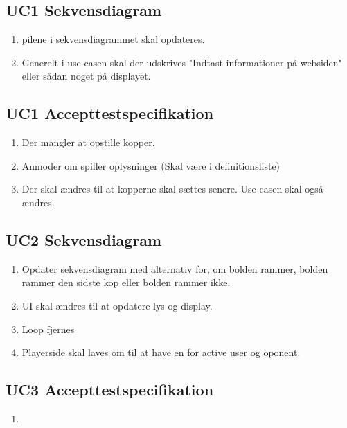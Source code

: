 \subsection{UC1 Sekvensdiagram}
\begin{enumerate}
    \item pilene i sekvensdiagrammet skal opdateres.
    \item Generelt i use casen skal der udskrives "Indtast informationer på websiden" eller sådan noget på displayet.
\end{enumerate}
\subsection{UC1 Accepttestspecifikation}
\begin{enumerate}
    \item Der mangler at opstille kopper.
    \item Anmoder om spiller oplysninger (Skal være i definitionsliste)
    \item Der skal ændres til at kopperne skal sættes senere. Use casen skal også ændres.
\end{enumerate}

\subsection{UC2 Sekvensdiagram}
\begin{enumerate}
    \item Opdater sekvensdiagram med alternativ for, om bolden rammer, bolden rammer den sidste kop eller bolden rammer ikke.
    \item UI skal ændres til at opdatere lys og display.
    \item Loop fjernes
    \item Playerside skal laves om til at have en for active user og oponent.
\end{enumerate}
\subsection{UC3 Accepttestspecifikation}
\begin{enumerate}
    \item 
\end{enumerate}

